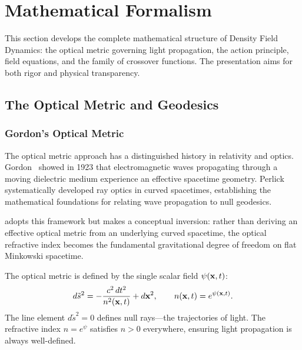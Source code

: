 
\section{Mathematical Formalism}\label{sec:formalism}

This section develops the complete mathematical structure of Density Field 
Dynamics: the optical metric governing light propagation, the action principle, 
field equations, and the family of crossover functions. The presentation aims 
for both rigor and physical transparency.

\subsection{The Optical Metric and Geodesics}\label{sec:optical_metric}

\subsubsection{Gordon's Optical Metric}

The optical metric approach has a distinguished history in relativity and 
optics. Gordon~\cite{Gordon1923} showed in 1923 that electromagnetic waves 
propagating through a moving dielectric medium experience an effective 
spacetime geometry. Perlick~\cite{Perlick2000} systematically developed 
ray optics in curved spacetimes, establishing the mathematical foundations 
for relating wave propagation to null geodesics.

\DFD adopts this framework but makes a conceptual inversion: rather than 
deriving an effective optical metric from an underlying curved spacetime, 
the optical refractive index becomes the fundamental gravitational degree 
of freedom on flat Minkowski spacetime.

The optical metric is defined by the single scalar field $\psi(\mathbf{x}, t)$:
\begin{equation}
d\tilde{s}^2 = -\frac{c^2\,dt^2}{n^2(\mathbf{x},t)} + d\mathbf{x}^2, 
\qquad n(\mathbf{x},t) = e^{\psi(\mathbf{x},t)}.
\label{eq:optical_metric_full}
\end{equation}
The line element $d\tilde{s}^2 = 0$ defines null rays---the trajectories 
of light. The refractive index $n = e^\psi$ satisfies $n > 0$ everywhere, 
ensuring light propagation is always well-defined.

